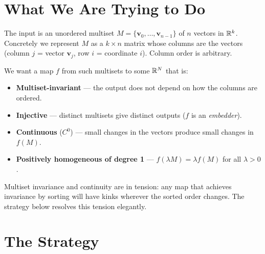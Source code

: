 %
%
\section{What We Are Trying to Do}
\label{sec:goals}

The input is an unordered multiset $M = \{\mathbf{v}_0,\ldots,\mathbf{v}_{n-1}\}$
of $n$ vectors in $\mathbb{R}^k$.  Concretely we represent $M$ as a $k\times n$ matrix
whose columns are the vectors (column $j$ = vector $\mathbf{v}_j$, row $i$ =
coordinate $i$).  Column order is arbitrary.

We want a map $f$ from such multisets to some $\mathbb{R}^N$ that is:
\begin{itemize}[nosep]
  \item \textbf{Multiset-invariant} — the output does not depend on how the
        columns are ordered.
  \item \textbf{Injective} — distinct multisets give distinct outputs ($f$ is
        an \emph{embedder}).
  \item \textbf{Continuous} ($C^0$) — small changes in the vectors produce
        small changes in $f(M)$.
  \item \textbf{Positively homogeneous of degree 1} — $f(\lambda M) =
        \lambda f(M)$ for all $\lambda > 0$.
\end{itemize}

Multiset invariance and continuity are in tension: any map that achieves
invariance by sorting will have kinks wherever the sorted order changes.
The strategy below resolves this tension elegantly.

\section{The Strategy}
\label{sec:strategy}

